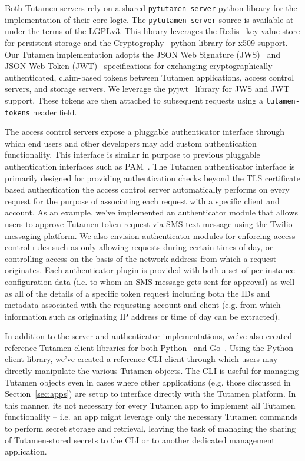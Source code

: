 Both Tutamen servers rely on a shared \texttt{pytutamen-server} python
library for the implementation of their core logic. The
\texttt{pytutamen-server} source is available
at~\cite{src-tutamen-pytutamenserver} under the terms of the
LGPLv3. This library leverages the Redis~\cite{redis} key-value store
for persistent storage and the Cryptography~\cite{python-cryptography}
python library for x509 support. Our Tutamen implementation adopts the
JSON Web Signature (JWS)~\cite{rfc7515} and JSON Web Token
(JWT)~\cite{rfc7519} specifications for exchanging cryptographically
authenticated, claim-based tokens between Tutamen applications, access
control servers, and storage servers. We leverage the
pyjwt~\cite{pyjwt} library for JWS and JWT support. These tokens are
then attached to subsequent requests using a \texttt{tutamen-tokens}
header field.

The access control servers expose a pluggable authenticator interface
through which end users and other developers may add custom
authentication functionality. This interface is similar in purpose to
previous pluggable authentication interfaces such as
PAM~\cite{samar1996}. The Tutamen authenticator interface is primarily
designed for providing authentication checks beyond the TLS
certificate based authentication the access control server
automatically performs on every request for the purpose of associating
each request with a specific client and account. As an example, we've
implemented an authenticator module that allows users to approve
Tutamen token request via SMS text message using the
Twilio~\cite{twilio} messaging platform. We also envision
authenticator modules for enforcing access control rules such as only
allowing requests during certain times of day, or controlling access on
the basis of the network address from which a request originates. Each
authenticator plugin is provided with both a set of per-instance
configuration data (i.e. to whom an SMS message gets sent for
approval) as well as all of the details of a specific token request
including both the IDs and metadata associated with the requesting
account and client (e.g. from which information such as originating IP
address or time of day can be extracted).

In addition to the server and authenticator implementations, we've
also created reference Tutamen client libraries for both
Python~\cite{src-tutamen-pytutamen} and
Go~\cite{src-tutamen-go}. Using the Python client library, we've
created a reference CLI client through which users may directly
manipulate the various Tutamen objects. The CLI is useful for managing
Tutamen objects even in cases where other applications (e.g. those
discussed in Section~\ref{sec:apps}) are setup to interface directly
with the Tutamen platform. In this manner, its not necessary for every
Tutamen app to implement all Tutamen functionality -- i.e. an app
might leverage only the necessary Tutamen commands to perform secret
storage and retrieval, leaving the task of managing the sharing of
Tutamen-stored secrets to the CLI or to another dedicated management
application.


